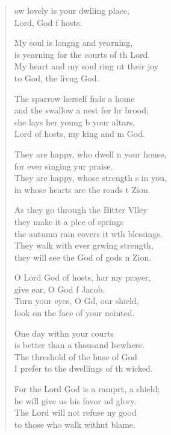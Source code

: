 \begin{verse}
  \begin{patverse}
ow lovely is your dwlling place,\Med\\
Lord, God f hosts.

My soul is long\pointup{\i}ng and yearning,\Med\\
is yearning for the courts of th Lord.\\
My heart and my soul ring ut their joy\Med\\
to God, the liv\pointup{\i}ng God.

The sparrow herself f\pointup{\i}nds a home\Med\\
and the swallow a nest for hr brood;\\
she lays her young b your altars,\Med\\
Lord of hosts, my king and m God.

They are happy, who dwell \pointup{\i}n your house,\Med\\
for ever singing yur praise.\\
They are happy, whose strength \pointup{\i}s in you,\Med\\
in whose hearts are the roads t Zion.

As they go through the Bitter Vlley\Flex\\
they make it a plce of springs\Med\\
the autumn rain covers it w\pointup{\i}th blessings.\\
They walk with ever grwing strength,\Med\\
they will see the God of gods \pointup{\i}n Zion.

O Lord God of hosts, har my prayer,\Med\\
give ear, O God f Jacob.\\
Turn your eyes, O Gd, our shield,\Med\\
look on the face of your nointed.

One day with\pointup{\i}n your courts\Med\\
is better than a thousand lsewhere.\\
The threshold of the huse of God\Med\\
I prefer to the dwellings of th wicked.

For the Lord God is a ramprt, a shield;\Med\\
he will give us his favor nd glory.\\
The Lord will not refuse ny good\Med\\
to those who walk withut blame.


\end{patverse}
\end{verse}
